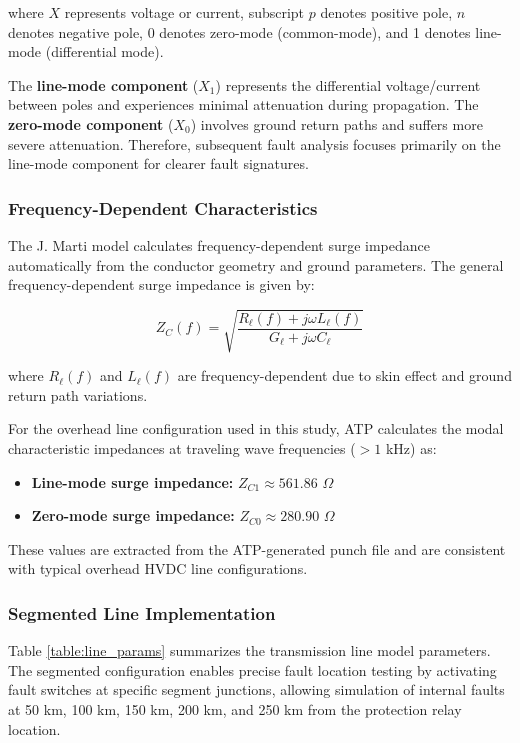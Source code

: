 \documentclass[journal]{IEEEtran}
\begin{document}
\noindent where $X$ represents voltage or current, subscript $p$ denotes positive pole, $n$ denotes negative pole, 0 denotes zero-mode (common-mode), and 1 denotes line-mode (differential mode).

The \textbf{line-mode component} ($X_1$) represents the differential voltage/current between poles and experiences minimal attenuation during propagation. The \textbf{zero-mode component} ($X_0$) involves ground return paths and suffers more severe attenuation. Therefore, subsequent fault analysis focuses primarily on the line-mode component for clearer fault signatures.

\subsubsection{Frequency-Dependent Characteristics}

The J. Marti model calculates frequency-dependent surge impedance automatically from the conductor geometry and ground parameters. The general frequency-dependent surge impedance is given by:

\begin{equation}
Z_C(f) = \sqrt{\frac{R_\ell(f) + j\omega L_\ell(f)}{G_\ell + j\omega C_\ell}}
\label{eq:surge_impedance}
\end{equation}

\noindent where $R_\ell(f)$ and $L_\ell(f)$ are frequency-dependent due to skin effect and ground return path variations.

For the overhead line configuration used in this study, ATP calculates the modal characteristic impedances at traveling wave frequencies ($> 1$ kHz) as:

\begin{itemize}
    \item \textbf{Line-mode surge impedance:} $Z_{C1} \approx 561.86$ $\Omega$
    \item \textbf{Zero-mode surge impedance:} $Z_{C0} \approx 280.90$ $\Omega$  
\end{itemize}

These values are extracted from the ATP-generated punch file and are consistent with typical overhead HVDC line configurations.

\subsubsection{Segmented Line Implementation}

Table \ref{table:line_params} summarizes the transmission line model parameters. The segmented configuration enables precise fault location testing by activating fault switches at specific segment junctions, allowing simulation of internal faults at 50 km, 100 km, 150 km, 200 km, and 250 km from the protection relay location.
\end{document}

